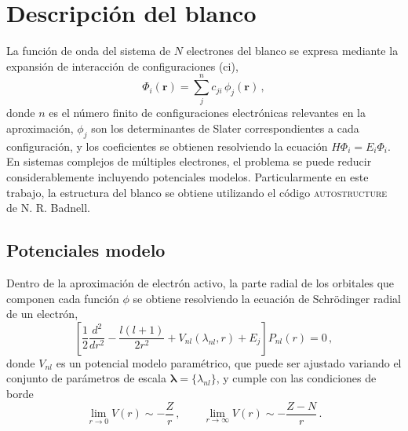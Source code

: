 \section{Descripción del blanco}
\label{sec:target-rmatrix}

La función de onda del sistema de $N$ electrones del blanco se expresa 
mediante la expansión de interacción de configuraciones (\acs{ci}),
\begin{equation*}
\Phi_i(\mathbf{r})=\sum_j^{n} c_{ji} \, \phi_j(\mathbf{r})\,,
\label{eq:phi-RM}
\end{equation*}
donde $n$ es el número finito de configuraciones electrónicas relevantes 
en la aproximación, $\phi_j$ son los determinantes de Slater 
correspondientes a cada configuración, y los coeficientes se obtienen 
resolviendo la ecuación $H\Phi_i=E_i\Phi_i$. En sistemas complejos de 
múltiples electrones, el problema se puede reducir considerablemente 
incluyendo potenciales modelos. 
Particularmente en este trabajo, la estructura del blanco se obtiene
utilizando el código \textsc{autostructure}~\cite{Badnell:11} de 
N. R. Badnell. 

\subsection{Potenciales modelo}
\label{subsec:potmod-rmatrix}

Dentro de la aproximación de electrón activo, la parte radial de los 
orbitales que componen cada función $\phi$ se obtiene resolviendo la 
ecuación de Schr\"odinger radial de un electrón,
\begin{equation*}
\left[ \frac{1}{2} \frac{d^2}{dr^2} - \frac{l(l+1)}{2r^2} 
 + V_{nl}(\lambda_{nl},r) + E_j \right] P_{nl}(r)=0\,,
\label{eq:Schro-potmod}
\end{equation*}
donde $V_{nl}$ es un potencial modelo paramétrico, que puede ser 
ajustado variando el conjunto de parámetros de escala 
$\boldsymbol\lambda=\{\lambda_{nl}\}$, y cumple con las condiciones de 
borde
\begin{equation}
\lim_{r \rightarrow 0} V(r) \sim -\frac{Z}{r} \,,\qquad
\lim_{r \rightarrow \infty} V(r) \sim -\frac{Z-N}{r} \,.
\end{equation}

